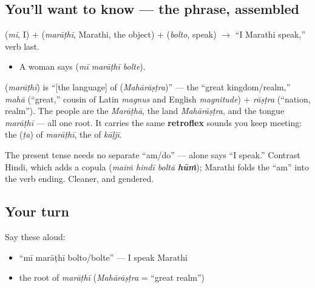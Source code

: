\subsection*{You'll want to know — the phrase, assembled}
\textbf{} (\emph{mī}, I) + \textbf{} (\emph{marāṭhī}, Marathi, the object) + \textbf{} (\emph{bolto}, speak) $\to$ \textquotedblleft{}I Marathi speak,\textquotedblright{} verb last.

\begin{itemize}
\raggedright
  \item A woman says \textbf{  } (\emph{mī marāṭhī bolte}).
\end{itemize}

\begin{cousinweb}
\textbf{} (\emph{marāṭhī}) is \textquotedblleft{}{[}the language{]} of \textbf{} (\emph{Mahārāṣṭra})\textquotedblright{} — the \textquotedblleft{}great kingdom/realm,\textquotedblright{} \emph{mahā} (\textquotedblleft{}great,\textquotedblright{} cousin of Latin \emph{magnus} and English \emph{magnitude}) + \emph{rāṣṭra} (\textquotedblleft{}nation, realm\textquotedblright{}). The people are the \emph{Marāṭhā}, the land \emph{Mahārāṣṭra}, and the tongue \emph{marāṭhī} — all one root. It carries the same \textbf{retroflex} sounds you keep meeting: the  (\emph{ṭa}) of \emph{marāṭhī}, the  of \emph{kāḷjī}.
\end{cousinweb}

\begin{culture}
The present tense needs no separate \textquotedblleft{}am/do\textquotedblright{} — \textbf{} alone says \textquotedblleft{}I speak.\textquotedblright{} Contrast Hindi, which adds a copula (\emph{maiṁ hindī boltā \textbf{hūṁ}}); Marathi folds the \textquotedblleft{}am\textquotedblright{} into the verb ending. Cleaner, and gendered.
\end{culture}

\subsection*{Your turn}
Say these aloud:

\begin{itemize}
\raggedright
  \item \textquotedblleft{}mī marāṭhī bolto/bolte\textquotedblright{} — I speak Marathi
  \item the root of \emph{marāṭhī} (\emph{Mahārāṣṭra} = \textquotedblleft{}great realm\textquotedblright{})
\end{itemize}

